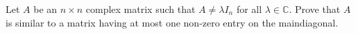 Let $A$ be an $n\times n$ complex matrix such that  $A \ne \lambda I_{n}$  for all $\lambda \in \mathbb{C}$. Prove that $A$ is similar to a matrix having at most one non-zero entry on the maindiagonal.